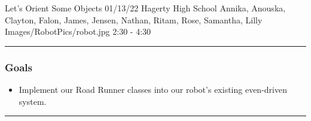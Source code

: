 \insertmeeting 
	{Let's Orient Some Objects} 
	{01/13/22} 
	{Hagerty High School}
	{Annika, Anouska, Clayton, Falon, James, Jensen, Nathan, Ritam, Rose, Samantha, Lilly}
	{Images/RobotPics/robot.jpg}
	{2:30 - 4:30}
	
\noindent\hfil\rule{\textwidth}{.4pt}\hfil
\subsubsection*{Goals}
\begin{itemize}
    \item Implement our Road Runner classes into our robot's existing even-driven system. 

\end{itemize} 

\noindent\hfil\rule{\textwidth}{.4pt}\hfil

